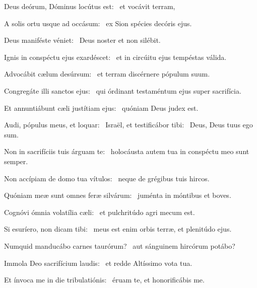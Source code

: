 \item Deus deórum, Dóminus locútus est:~\psstar{} et vocávit terram,

\item A solis ortu usque ad occásum:~\psstar{} ex Sion spécies decóris ejus.

\item Deus maniféste véniet:~\psstar{} Deus noster et non silébit.

\item Ignis in conspéctu ejus exardéscet:~\psstar{} et in circúitu ejus tempéstas válida.

\item Advocábit cælum desúrsum:~\psstar{} et terram discérnere pópulum suum.

\item Congregáte illi sanctos ejus:~\psstar{} qui órdinant testaméntum ejus super sacrifícia.

\item Et annuntiábunt cæli justítiam ejus:~\psstar{} quóniam Deus judex est.

\item Audi, pópulus meus, et loquar:~\pscross{} Israël, et testificábor tibi:~\psstar{} Deus, Deus tuus ego sum.

\item Non in sacrifíciis tuis árguam te:~\psstar{} holocáusta autem tua in conspéctu meo sunt semper.

\item Non accípiam de domo tua vítulos:~\psstar{} neque de grégibus tuis hircos.

\item Quóniam meæ sunt omnes feræ silvárum:~\psstar{} juménta in móntibus et boves.

\item Cognóvi ómnia volatília cæli:~\psstar{} et pulchritúdo agri mecum est.

\item Si esuríero, non dicam tibi:~\psstar{} meus est enim orbis terræ, et plenitúdo ejus.

\item Numquid manducábo carnes taurórum?~\psstar{} aut sánguinem hircórum potábo?

\item Immola Deo sacrifícium laudis:~\psstar{} et redde Altíssimo vota tua.

\item Et ínvoca me in die tribulatiónis:~\psstar{} éruam te, et honorificábis me.
